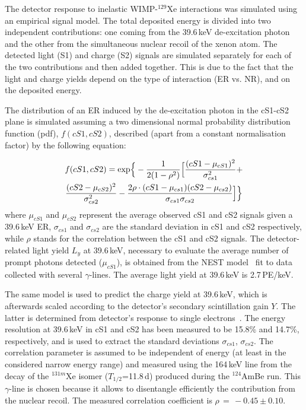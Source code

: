 The detector response to inelastic WIMP-$^{129}$Xe interactions was simulated using an empirical signal model.
The total deposited energy is divided into two independent contributions: one coming from the 39.6\,keV de-excitation photon and the other  from  
the simultaneous nuclear recoil of the xenon atom. The detected light (S1) and charge (S2) signals are simulated separately for each of the two contributions 
and then added together. This is due to the fact that the light and charge yields depend on the type of interaction (ER vs. NR), and on the deposited energy.


The distribution of an ER induced by the de-excitation photon in the cS1-cS2 plane  is simulated assuming a two dimensional normal probability distribution function (pdf), $f(cS1,cS2)$, 
described (apart from a constant normalisation factor) by the following equation:

\begin{multline}
	f(cS1,cS2)  = {\rm exp} \Big\{ -\frac{1}{2(1-\rho^2)} \Big[ \frac{(cS1 - \mu_{cS1})^2}{\sigma_{cs1}^2} + \\ 
	 \frac{(cS2 - \mu_{cS2})^2}{\sigma_{cs2}^2} - \frac{2\rho\cdot(cS1 - \mu_{cs1}) (cS2 - \mu_{cs2})} {\sigma_{cs1}\sigma_{cs2}} \Big] \Big\}
\label{f:2dgaus}
\end{multline}
where $\mu_{cS1}$ and $\mu_{cS2}$ 
represent the average observed cS1 and cS2 signals given a 39.6\,keV ER, $\sigma_{cs1}$ and $\sigma_{cs2}$ are the standard deviation in cS1 and cS2 respectively,
while $\rho$ stands for the correlation between the cS1 and cS2 signals. The detector-related light yield $L_y$  at 39.6\,keV, necessary to evaluate the average number of prompt photons detected 
($\mu_{cS1}$), is obtained from the NEST model~\cite{NEST,Geant1,Geant2} fit to data collected with several $\gamma$-lines.  The average light yield at 39.6\,keV is 2.7\,PE/keV.

The same model is used to predict the charge yield at 39.6\,keV, which is afterwards scaled according to the detector's secondary scintillation gain $Y$. 
 The latter is determined from detector's response to single electrons~\cite{SingleE}.
The energy resolution at 39.6\,keV in cS1 and cS2 has been measured to be 15.8\% and 14.7\%, respectively, and is used to extract the standard 
deviations $\sigma_{cs1}$, $\sigma_{cs2}$.  The correlation parameter is assumed to be independent of energy (at least in the considered narrow energy range) and measured
using the 164\,keV line from the decay of the $^{131m}$Xe isomer ($T_{1/2}$=11.8\,d) produced during the  $^{124}$AmBe run. This $\gamma$-line is chosen because it allows to disentangle efficiently the contribution from the nuclear recoil. The measured correlation coefficient is $\rho \, = \, -0.45 \pm 0.10$. 



